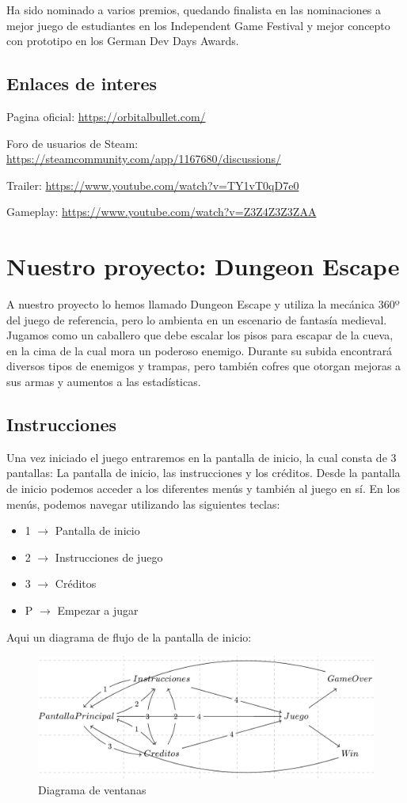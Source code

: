 \documentclass{article}
\begin{document}
    Ha sido nominado a varios premios, quedando finalista en las nominaciones a mejor juego de estudiantes en los Independent Game Festival y mejor concepto con prototipo en los German Dev Days Awards.
\subsection{Enlaces de interes}

    Pagina oficial: \url{https://orbitalbullet.com/}

    Foro de usuarios de Steam: \url{https://steamcommunity.com/app/1167680/discussions/}

    Trailer: \url{https://www.youtube.com/watch?v=TY1vT0qD7e0}

    Gameplay: \url{https://www.youtube.com/watch?v=Z3Z4Z3Z3ZAA}

\section{Nuestro proyecto: Dungeon Escape}
    A nuestro proyecto lo hemos llamado Dungeon Escape y utiliza la mecánica 360º del juego de referencia, pero lo ambienta en un escenario de fantasía medieval. 
    Jugamos como un caballero que debe escalar los pisos para escapar de la cueva, en la cima de la cual mora un poderoso enemigo. 
    Durante su subida encontrará diversos tipos de enemigos y trampas, pero también cofres que otorgan mejoras a sus armas y aumentos a las estadísticas.

    \subsection{Instrucciones}
    Una vez iniciado el juego entraremos en la pantalla de inicio, la cual consta de 3 pantallas: 
    La pantalla de inicio, las instrucciones y los créditos.
    Desde la pantalla de inicio podemos acceder a los diferentes menús y también al juego en sí.
    En los menús, podemos navegar utilizando las siguientes teclas:
    \begin{itemize}
        \item 1 $\rightarrow$ Pantalla de inicio
        \item 2 $\rightarrow$ Instrucciones de juego 
        \item 3 $\rightarrow$ Créditos
        \item P $\rightarrow$ Empezar a jugar
    \end{itemize}
    Aqui un diagrama de flujo de la pantalla de inicio:
    \begin{figure}[h]
        \centering
        \includegraphics[width=.7\textwidth]{img/10.png}
        \caption[width=.7\textwidth]{Diagrama de ventanas}
    \end{figure}
\end{document}
